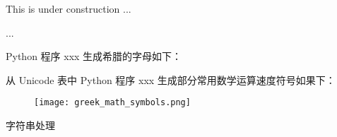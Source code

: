 \documentclass[main.tex]{subfiles}
\begin{document}
This is under construction
...

...

Python 程序 xxx 生成希腊的字母如下：


从 Unicode 表中 Python 程序 xxx 生成部分常用数学运算速度符号如果下：

\newpage
\begin{figure}
	\texttt{[image: greek\_math\_symbols.png]}
\end{figure}


字符串处理

\newpage
\end{document}

